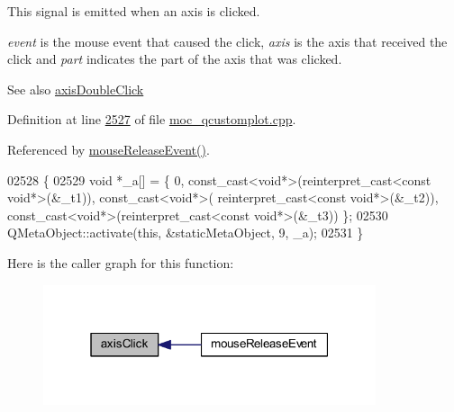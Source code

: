 This signal is emitted when an axis is clicked. 

{\itshape event} is the mouse event that caused the click, {\itshape axis} is the axis that received the click and {\itshape part} indicates the part of the axis that was clicked.

\begin{DoxySeeAlso}{See also}
\hyperlink{a00116_a6df35357460181a72da3e93d600f5256}{axis\+Double\+Click} 
\end{DoxySeeAlso}


Definition at line \hyperlink{a00067_source_l02527}{2527} of file \hyperlink{a00067_source}{moc\+\_\+qcustomplot.\+cpp}.



Referenced by \hyperlink{a00115_source_l07691}{mouse\+Release\+Event()}.


\begin{DoxyCode}
02528 \{
02529     \textcolor{keywordtype}{void} *\_a[] = \{ 0, \textcolor{keyword}{const\_cast<}\textcolor{keywordtype}{void}*\textcolor{keyword}{>}(\textcolor{keyword}{reinterpret\_cast<}\textcolor{keyword}{const }\textcolor{keywordtype}{void}*\textcolor{keyword}{>}(&\_t1)), \textcolor{keyword}{const\_cast<}\textcolor{keywordtype}{void}*\textcolor{keyword}{>}(\textcolor{keyword}{
      reinterpret\_cast<}\textcolor{keyword}{const }\textcolor{keywordtype}{void}*\textcolor{keyword}{>}(&\_t2)), \textcolor{keyword}{const\_cast<}\textcolor{keywordtype}{void}*\textcolor{keyword}{>}(\textcolor{keyword}{reinterpret\_cast<}\textcolor{keyword}{const }\textcolor{keywordtype}{void}*\textcolor{keyword}{>}(&\_t3)) \};
02530     QMetaObject::activate(\textcolor{keyword}{this}, &staticMetaObject, 9, \_a);
02531 \}
\end{DoxyCode}


Here is the caller graph for this function\+:
\nopagebreak
\begin{figure}[H]
\begin{center}
\leavevmode
\includegraphics[width=277pt]{d4/d3e/a00116_abf635f8b56ab5c16d5de9f358543e82b_icgraph}
\end{center}
\end{figure}


